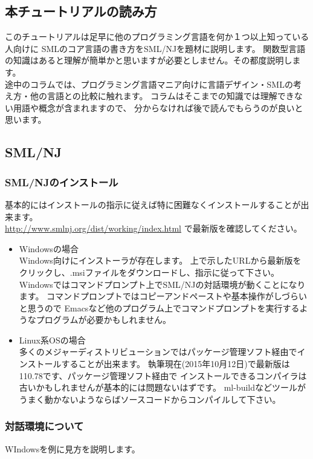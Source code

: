 \documentclass[11pt,a4paper]{jarticle}
\begin{document}
\subsection{本チュートリアルの読み方}
このチュートリアルは足早に他のプログラミング言語を何か１つ以上知っている人向けに
SMLのコア言語の書き方をSML/NJを題材に説明します。
関数型言語の知識はあると理解が簡単かと思いますが必要としません。その都度説明します。\\
途中のコラムでは、プログラミング言語マニア向けに言語デザイン・SMLの考え方・他の言語との比較に触れます。
コラムはそこまでの知識では理解できない用語や概念が含まれますので、
分からなければ後で読んでもらうのが良いと思います。

\subsection{SML/NJ}
\subsubsection{SML/NJのインストール}
基本的にはインストールの指示に従えば特に困難なくインストールすることが出来ます。\\
\url{http://www.smlnj.org/dist/working/index.html} で最新版を確認してください。
\begin{itemize}
\item Windowsの場合\\
  Windows向けにインストーラが存在します。
  上で示したURLから最新版をクリックし、.msiファイルをダウンロードし、指示に従って下さい。\\
  Windowsではコマンドプロンプト上でSML/NJの対話環境が動くことになります。
  コマンドプロンプトではコピーアンドペーストや基本操作がしづらいと思うので
  Emacsなど他のプログラム上でコマンドプロンプトを実行するようなプログラムが必要かもしれません。
\item Linux系OSの場合\\
  多くのメジャーディストリビューションではパッケージ管理ソフト経由でインストールすることが出来ます。
  執筆現在(2015年10月12日)で最新版は110.78です、パッケージ管理ソフト経由で
  インストールできるコンパイラは古いかもしれませんが基本的には問題ないはずです。
  ml-buildなどツールがうまく動かないようならばソースコードからコンパイルして下さい。
\end{itemize}
\subsubsection{対話環境について}
WIndowsを例に見方を説明します。
\end{document}
